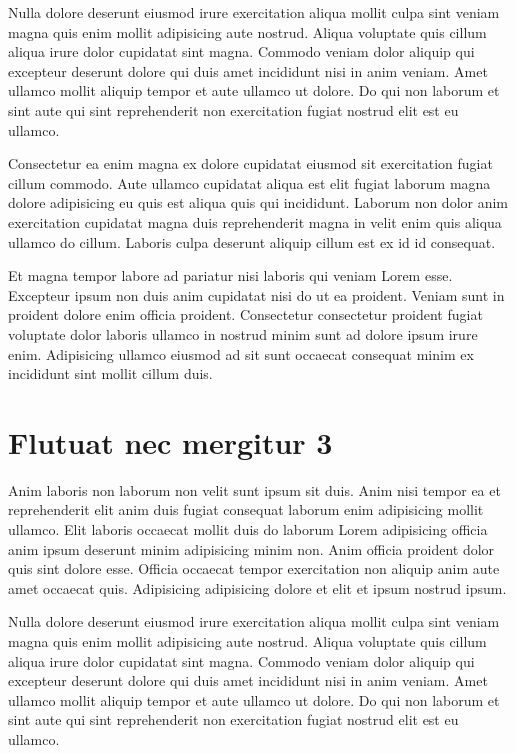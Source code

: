 \documentclass[a4paper,10pt,french]{sphinxmanual}
\begin{document}
Nulla dolore deserunt eiusmod irure exercitation aliqua mollit culpa sint veniam magna quis enim mollit adipisicing aute nostrud. Aliqua voluptate quis cillum aliqua irure dolor cupidatat sint magna. Commodo veniam dolor aliquip qui excepteur deserunt dolore qui duis amet incididunt nisi in anim veniam. Amet ullamco mollit aliquip tempor et aute ullamco ut dolore. Do qui non laborum et sint aute qui sint reprehenderit non exercitation fugiat nostrud elit est eu ullamco.

Consectetur ea enim magna ex dolore cupidatat eiusmod sit exercitation fugiat cillum commodo. Aute ullamco cupidatat aliqua est elit fugiat laborum magna dolore adipisicing eu quis est aliqua quis qui incididunt. Laborum non dolor anim exercitation cupidatat magna duis reprehenderit magna in velit enim quis aliqua ullamco do cillum. Laboris culpa deserunt aliquip cillum est ex id id consequat.

Et magna tempor labore ad pariatur nisi laboris qui veniam Lorem esse. Excepteur ipsum non duis anim cupidatat nisi do ut ea proident. Veniam sunt in proident dolore enim officia proident. Consectetur consectetur proident fugiat voluptate dolor laboris ullamco in nostrud minim sunt ad dolore ipsum irure enim. Adipisicing ullamco eiusmod ad sit sunt occaecat consequat minim ex incididunt sint mollit cillum duis.


\section{Flutuat nec mergitur 3}
\label{\detokenize{docs/guides/autocad-guide01:flutuat-nec-mergitur-3}}
Anim laboris non laborum non velit sunt ipsum sit duis. Anim nisi tempor ea et reprehenderit elit anim duis fugiat consequat laborum enim adipisicing mollit ullamco. Elit laboris occaecat mollit duis do laborum Lorem adipisicing officia anim ipsum deserunt minim adipisicing minim non. Anim officia proident dolor quis sint dolore esse. Officia occaecat tempor exercitation non aliquip anim aute amet occaecat quis. Adipisicing adipisicing dolore et elit et ipsum nostrud ipsum.

Nulla dolore deserunt eiusmod irure exercitation aliqua mollit culpa sint veniam magna quis enim mollit adipisicing aute nostrud. Aliqua voluptate quis cillum aliqua irure dolor cupidatat sint magna. Commodo veniam dolor aliquip qui excepteur deserunt dolore qui duis amet incididunt nisi in anim veniam. Amet ullamco mollit aliquip tempor et aute ullamco ut dolore. Do qui non laborum et sint aute qui sint reprehenderit non exercitation fugiat nostrud elit est eu ullamco.
\end{document}
